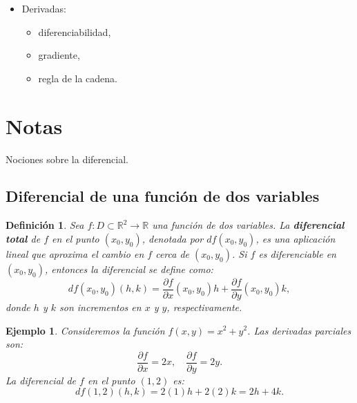 \documentclass[11pt]{book}
\theoremstyle{definicion}
\newtheorem{definicion}{Definición}[section]
\theoremstyle{teorema}
\theoremstyle{ejemplo}
\newtheorem{ejemplo}{Ejemplo}[section]
\begin{document}
\begin{itemize}
    \item Derivadas: %
%
\begin{itemize}
    \item diferenciabilidad,
    \item gradiente,
    \item regla de la cadena.
\end{itemize}
    
\end{itemize}

\section{Notas}

\noindent Nociones sobre la diferencial.

\subsection{Diferencial de una función de dos variables}

\begin{definicion}
Sea \( f: D \subset \mathbb{R}^2 \to \mathbb{R} \) una función de dos variables. La \textbf{diferencial total} de \( f \) en el punto \( (x_0, y_0) \), denotada por \( df(x_0, y_0) \), es una aplicación lineal que aproxima el cambio en \( f \) cerca de \( (x_0, y_0) \). Si \( f \) es diferenciable en \( (x_0, y_0) \), entonces la diferencial se define como:
\[
df(x_0, y_0)(h, k) = \frac{\partial f}{\partial x}(x_0, y_0)h + \frac{\partial f}{\partial y}(x_0, y_0)k,
\]
donde \( h \) y \( k \) son incrementos en \( x \) y \( y \), respectivamente.
\end{definicion}

\begin{ejemplo}
Consideremos la función \( f(x, y) = x^2 + y^2 \). Las derivadas parciales son:
\[
\frac{\partial f}{\partial x} = 2x, \quad \frac{\partial f}{\partial y} = 2y.
\]
La diferencial de \( f \) en el punto \( (1, 2) \) es:
\[
df(1, 2)(h, k) = 2(1)h + 2(2)k = 2h + 4k.
\]
\end{ejemplo}
\end{document}
